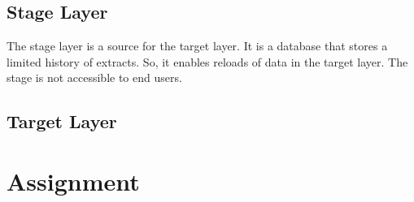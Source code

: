 \documentclass[a4paper,12pt,english,oneside]{book}
\begin{document}
\subsection{Stage Layer}

The stage layer is a source for the target layer. It is a database that stores a limited history of extracts. So, it enables reloads of data in the target layer. The stage is not accessible to end users.

\subsection{Target Layer}

\section{Assignment}
\end{document}
